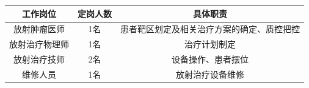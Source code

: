 \documentclass[a4paper]{article}
\begin{document}
\begin{tabular}{|c|c|c|}
\hline
工作岗位 & 定岗人数 & 具体职责 \\
\hline
放射肿瘤医师 & 1名 & 患者靶区划定及相关治疗方案的确定、质控把控 \\
\hline
放射治疗物理师 & 1名 & 治疗计划制定 \\
\hline
放射治疗技师 & 2名 & 设备操作、患者摆位 \\
\hline
维修人员 & 1名 & 放射治疗设备维修 \\
\hline%
\end{tabular}
\end{document}
